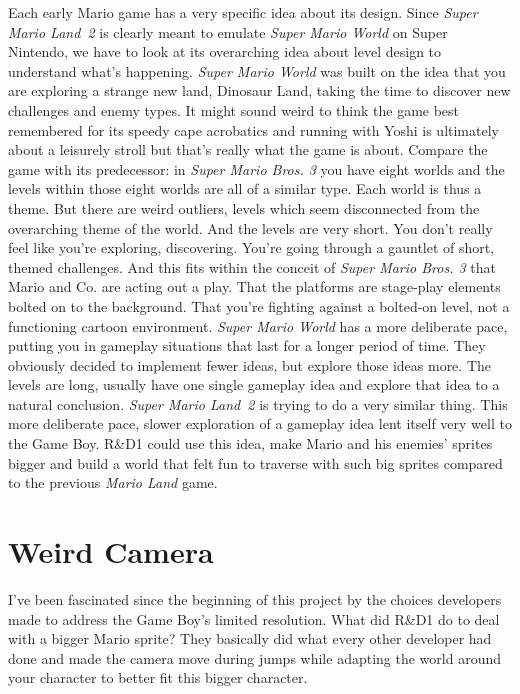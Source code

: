 \documentclass{book}
\begin{document}
Each early Mario game has a very specific idea about its design. Since \emph{Super Mario Land 2} is clearly meant to emulate \emph{Super Mario World} on Super Nintendo, we have to look at its overarching idea about level design to understand what’s happening. \emph{Super Mario World} was built on the idea that you are exploring a strange new land, Dinosaur Land, taking the time to discover new challenges and enemy types. It might sound weird to think the game best remembered for its speedy cape acrobatics and running with Yoshi is ultimately about a leisurely stroll but that’s really what the game is about. Compare the game with its predecessor: in \emph{Super Mario Bros. 3} you have eight worlds and the levels within those eight worlds are all of a similar type. Each world is thus a theme. But there are weird outliers, levels which seem disconnected from the overarching theme of the world. And the levels are very short. You don’t really feel like you’re exploring, discovering. You’re going through a gauntlet of short, themed challenges. And this fits within the conceit of \emph{Super Mario Bros. 3} that Mario and Co. are acting out a play. That the platforms are stage-play elements bolted on to the background. That you’re fighting against a bolted-on level, not a functioning cartoon environment. \emph{Super Mario World} has a more deliberate pace, putting you in gameplay situations that last for a longer period of time. They obviously decided to implement fewer ideas, but explore those ideas more. The levels are long, usually have one single gameplay idea and explore that idea to a natural conclusion. \emph{Super Mario Land 2} is trying to do a very similar thing. This more deliberate pace, slower exploration of a gameplay idea lent itself very well to the Game Boy. R\&D1 could use this idea, make Mario and his enemies’ sprites bigger and build a world that felt fun to traverse with such big sprites compared to the previous \emph{Mario Land} game.

\FloatBarrier\needspace{5pt}\section*{Weird Camera}\nopagebreak[4]

I’ve been fascinated since the beginning of this project by the choices developers made to address the Game Boy’s limited resolution. What did R\&D1 do to deal with a bigger Mario sprite? They basically did what every other developer had done and made the camera move during jumps while adapting the world around your character to better fit this bigger character.
\end{document}
